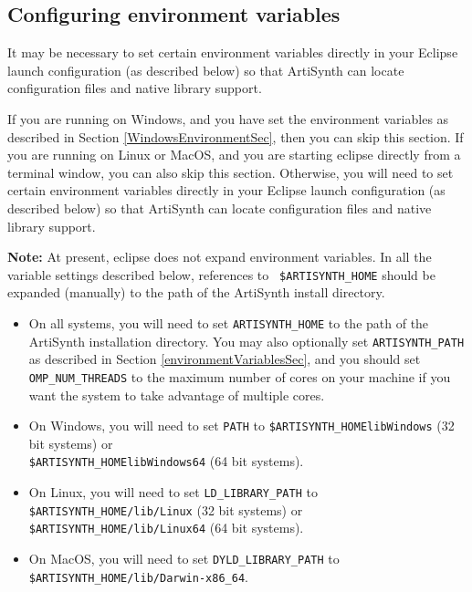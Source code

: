 \documentclass{article}
\begin{document}
\subsection{Configuring environment variables}
\label{EclipseEnvironmentVariablesSec}

It may be necessary to set certain environment variables directly in
your Eclipse launch configuration (as described below) so that
ArtiSynth can locate configuration files and native library support.

If you are running on Windows, and you have set the environment
variables as described in Section \ref{WindowsEnvironmentSec}, then
you can skip this section. If you are running on Linux or MacOS, and
you are starting eclipse directly from a terminal window, you can also
skip this section.  Otherwise, you will need to set certain
environment variables directly in your Eclipse launch configuration
(as described below) so that ArtiSynth can locate configuration files
and native library support.  

\begin{sideblock}
{\bf Note:} At present, eclipse does not expand environment variables.
In all the variable settings described below, references to {\tt
\$ARTISYNTH\_HOME} should be expanded (manually) to the path of the
ArtiSynth install directory.
\end{sideblock}

\begin{itemize}

\item On all systems, you will need to set {\tt ARTISYNTH\_HOME} to the path of
the ArtiSynth installation directory.  You may also optionally set
{\tt ARTISYNTH\_PATH} as described in Section \ref{environmentVariablesSec}, and you
should set {\tt OMP\_NUM\_THREADS} to the maximum number of cores on your
machine if you want the system to take advantage of multiple cores.




\item On Windows, you will need to set {\tt PATH} to
{\tt \$ARTISYNTH\_HOME\BKS lib\BKS Windows} (32 bit systems) or \\
{\tt \$ARTISYNTH\_HOME\BKS lib\BKS Windows64} (64 bit systems).

\item On Linux, you will need to set {\tt LD\_LIBRARY\_PATH} to
{\tt \$ARTISYNTH\_HOME/lib/Linux} (32 bit systems) or \\
{\tt \$ARTISYNTH\_HOME/lib/Linux64} (64 bit systems).

\item On MacOS, you will need to set {\tt DYLD\_LIBRARY\_PATH} to
{\tt \$ARTISYNTH\_HOME/lib/Darwin-x86\_64}.

\end{itemize}
\end{document}
